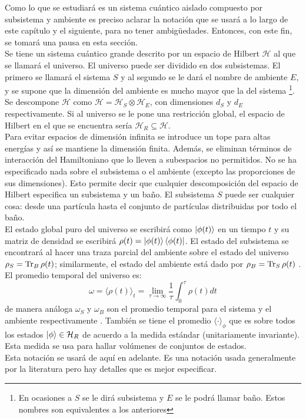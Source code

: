Como lo que se estudiará es un sistema cuántico aislado compuesto por subsistema y ambiente es preciso aclarar la notación que se usará a lo largo de este capítulo y el siguiente, para no tener ambigüedades. Entonces, con este fin, se tomará una pausa en esta sección.
\\
Se tiene un sistema cuántico grande descrito por un espacio de Hilbert $\mathcal{H}$ al que se llamará el universo. El universo puede ser dividido en dos subsistemas. El primero se llamará el sistema $S$ y al segundo se le dará el nombre de ambiente $E$, y se supone que la dimensión del ambiente es mucho mayor que la del sistema \footnote{En ocasiones a $S$ se le dirá subsistema y $E$ se le podrá llamar baño. Estos nombres son equivalentes a los anteriores}. Se descompone $\mathcal{H}$ como $\mathcal{H}=\mathcal{H}_{S} \otimes \mathcal{H}_{E}$, con dimensiones $d_{S}$ y $d_{E}$ respectivamente. Si al universo se le pone una restricción global, el espacio de Hilbert en el que se encuentra sería $\mathcal{H}_{R} \subseteq \mathcal{H}$.
\\
Para evitar espacios de dimensión infinita se introduce un tope para altas energías y así se mantiene la dimensión finita. Además, se eliminan términos de interacción del Hamiltoniano que lo lleven a subespacios no permitidos.  No se ha especificado nada sobre el subsistema o el ambiente (excepto las proporciones de sus dimensiones). Esto permite decir que cualquier descomposición del espacio de Hilbert especifica un subsistema y un baño. El subsistema $S$ puede ser cualquier cosa: desde una partícula hasta el conjunto de partículas distribuidas por todo el baño.
\\
El estado global puro del universo se escribirá como $\ket{\phi(t)}$ en un tiempo $t$ y su matriz de densidad se escribirá $\rho(t)=\ket{\phi(t)}\bra{\phi(t)}$. El estado del subsistema se encontrará al hacer una traza parcial del ambiente sobre el estado del universo $\rho_{S}= \Tr _{B} \rho(t)$; similarmente, el estado del ambiente está dado por $\rho_{B}=\Tr _{S} \rho(t)$ \cite{WildeInformation}. 
\\
El promedio temporal del universo es:
\begin{equation}
\omega= \langle \rho(t) \rangle_{t}= \lim_{\tau \to \infty} \frac{1}{\tau} \int_{0}^{\tau} \rho (t)dt
\end{equation}
de manera análoga $\omega_{S}$ y $\omega_{B}$ son el promedio temporal para el sistema y el ambiente respectivamente \cite{TodaStat}. También se tiene el promedio $\langle \cdot \rangle_{\phi}$ que es sobre todos los estados $\ket{\phi} \in \mathcal{H}_{R}$ de acuerdo a la medida estándar (unitariamente invariante). Esta medida se usa para hallar volúmenes de conjuntos de estados.
\\
Esta notación se usará de aquí en adelante. Es una notación usada generalmente por la literatura pero hay detalles que es mejor especificar.

